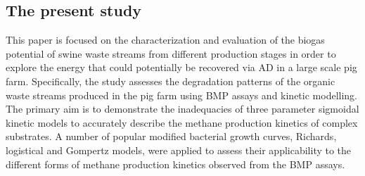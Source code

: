 \subsection{The present study}
This paper is focused on the characterization and evaluation of the biogas potential of swine waste streams from different production stages in order to explore the energy that could potentially be recovered via AD in a large scale pig farm. Specifically, the study assesses the degradation patterns of the organic waste streams produced in the pig farm using BMP assays and kinetic modelling. The primary aim is to demonstrate the inadequacies of three parameter sigmoidal kinetic models to accurately describe the methane production kinetics of complex substrates. A number of popular modified bacterial growth curves, Richards, logistical and Gompertz models, were applied to assess their applicability to the different forms of methane production kinetics observed from the BMP assays.